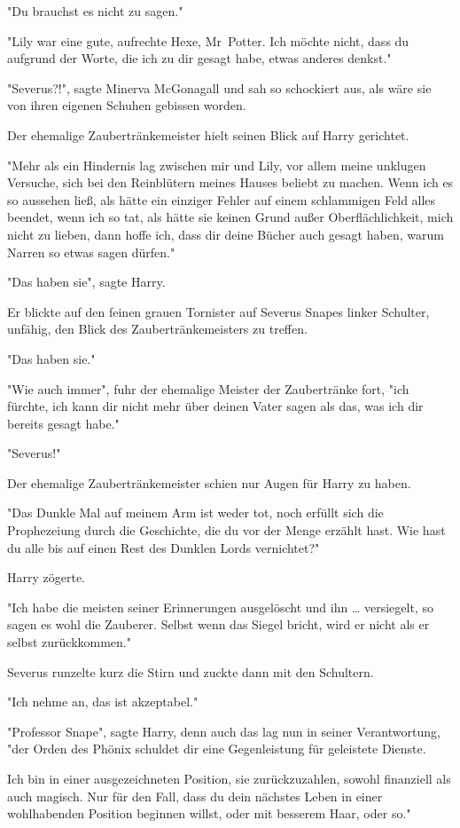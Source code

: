 {"Du brauchst es nicht zu sagen."

"Lily war eine gute, aufrechte Hexe, Mr~Potter. Ich möchte nicht, dass du aufgrund der Worte, die ich zu dir gesagt habe, etwas anderes denkst."

"Severus?!", sagte Minerva McGonagall und sah so schockiert aus, als wäre sie von ihren eigenen Schuhen gebissen worden.

Der ehemalige Zaubertränkemeister hielt seinen Blick auf Harry gerichtet.

"Mehr als ein Hindernis lag zwischen mir und Lily, vor allem meine unklugen Versuche, sich bei den Reinblütern meines Hauses beliebt zu machen. Wenn ich es so aussehen ließ, als hätte ein einziger Fehler auf einem schlammigen Feld alles beendet, wenn ich so tat, als hätte sie keinen Grund außer Oberflächlichkeit, mich nicht zu lieben, dann hoffe ich, dass dir deine Bücher auch gesagt haben, warum Narren so etwas sagen dürfen."

"Das haben sie", sagte Harry.

Er blickte auf den feinen grauen Tornister auf Severus Snapes linker Schulter, unfähig, den Blick des Zaubertränkemeisters zu treffen.

"Das haben sie."

"Wie auch immer", fuhr der ehemalige Meister der Zaubertränke fort, "ich fürchte, ich kann dir nicht mehr über deinen Vater sagen als das, was ich dir bereits gesagt habe."

"Severus!"

Der ehemalige Zaubertränkemeister schien nur Augen für Harry zu haben.

"Das Dunkle Mal auf meinem Arm ist weder tot, noch erfüllt sich die Prophezeiung durch die Geschichte, die du vor der Menge erzählt hast. Wie hast du alle bis auf einen Rest des Dunklen Lords vernichtet?"

Harry zögerte.

"Ich habe die meisten seiner Erinnerungen ausgelöscht und ihn … versiegelt, so sagen es wohl die Zauberer. Selbst wenn das Siegel bricht, wird er nicht als er selbst zurückkommen."

Severus runzelte kurz die Stirn und zuckte dann mit den Schultern.

"Ich nehme an, das ist akzeptabel."

"Professor Snape", sagte Harry, denn auch das lag nun in seiner Verantwortung, "der Orden des Phönix schuldet dir eine Gegenleistung für geleistete Dienste.

Ich bin in einer ausgezeichneten Position, sie zurückzuzahlen, sowohl finanziell als auch magisch. Nur für den Fall, dass du dein nächstes Leben in einer wohlhabenden Position beginnen willst, oder mit besserem Haar, oder so."

}
